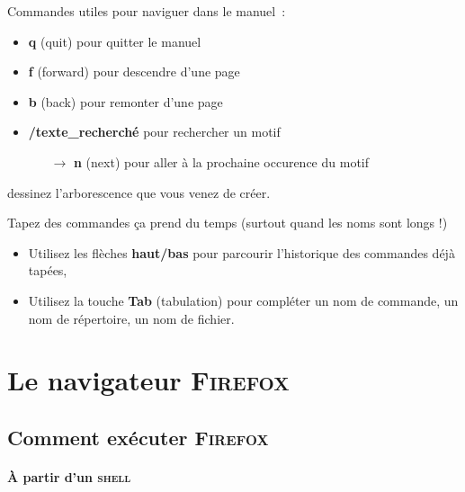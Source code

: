 \documentclass[a4paper,11pt]{article}
\newcommand{\netscape}{\textsc{Firefox}\xspace}
\newcommand{\openwin}{\textsc{Java Desktop System}\xspace}
\newcommand{\shell}{\textsc{shell}\xspace}
\begin{document}
Commandes utiles pour naviguer dans le manuel~:
\begin{itemize}
  \item \textbf{q} (quit) pour quitter le manuel
  \item \textbf{f} (forward) pour descendre d'une page
  \item \textbf{b} (back) pour remonter d'une page
  \item \textbf{/texte\_recherché} pour rechercher un motif
        \begin{itemize}
          \item[\(\rightarrow\)] \textbf{n} (next) pour aller à la prochaine occurence du motif
        \end{itemize}
\end{itemize}
\vspace{0.3cm}
\begin{maw}[Exercice]
dessinez l'arborescence que vous venez de créer.
\end{maw}

\begin{maw}[Conseil]
Tapez des commandes ça prend du temps (surtout quand les noms sont longs !)
\begin{itemize}
  \item Utilisez les flèches \textbf{haut/bas} pour parcourir l'historique des
        commandes déjà tapées,
  \item Utilisez la touche \textbf{Tab} (tabulation) pour compléter un nom de
        commande, un nom de répertoire, un nom de fichier.
\end{itemize}
\end{maw}

\newpage
\section{Le navigateur \netscape}

\subsection{Comment exécuter \netscape}

%
%

\paragraph{À partir d'un \shell}
\end{document}
